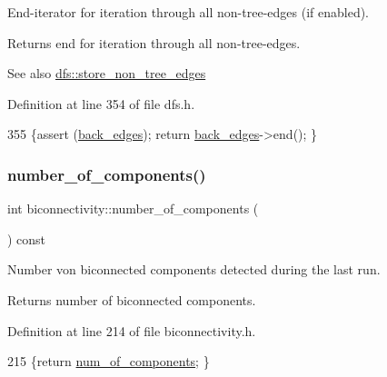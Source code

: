 End-\/iterator for iteration through all non-\/tree-\/edges (if enabled). 

\begin{DoxyReturn}{Returns}
end for iteration through all non-\/tree-\/edges. 
\end{DoxyReturn}
\begin{DoxySeeAlso}{See also}
\mbox{\hyperlink{classdfs_a6f54f1c4339eacc8961e795439d4593d}{dfs\+::store\+\_\+non\+\_\+tree\+\_\+edges}} 
\end{DoxySeeAlso}


Definition at line 354 of file dfs.\+h.


\begin{DoxyCode}
355     \{assert (\mbox{\hyperlink{classdfs_a1dc18a7df8d6b238d5301c92fc7540fa}{back\_edges}}); \textcolor{keywordflow}{return} \mbox{\hyperlink{classdfs_a1dc18a7df8d6b238d5301c92fc7540fa}{back\_edges}}->end(); \}
\end{DoxyCode}
\mbox{\label{classbiconnectivity_ad77634a59ac6a08fae43c1c38540d5f0}} 
\subsubsection{\texorpdfstring{number\+\_\+of\+\_\+components()}{number\_of\_components()}}
{\footnotesize\ttfamily int biconnectivity\+::number\+\_\+of\+\_\+components (\begin{DoxyParamCaption}{ }\end{DoxyParamCaption}) const\hspace{0.3cm}{\ttfamily [inline]}}



Number von biconnected components detected during the last run. 

\begin{DoxyReturn}{Returns}
number of biconnected components. 
\end{DoxyReturn}


Definition at line 214 of file biconnectivity.\+h.


\begin{DoxyCode}
215     \{\textcolor{keywordflow}{return} \mbox{\hyperlink{classbiconnectivity_a89fbd540b8a61aad150020be657ddfb7}{num\_of\_components}}; \}
\end{DoxyCode}
\mbox{\label{classdfs_ae8849a552721ad4af5d9a81c6da35822}} 
